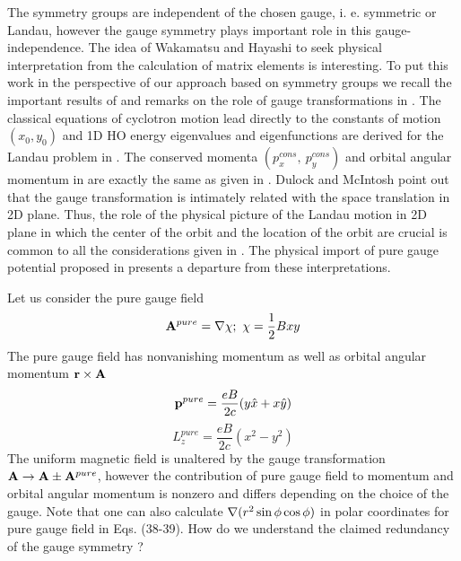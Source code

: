\documentclass[aps, singlecolumn, showpacs]{revtex4-2}
\begin{document}
The symmetry groups are independent of the chosen gauge, i. e. symmetric or Landau, however the gauge symmetry plays important role in this gauge-independence. The idea of Wakamatsu and Hayashi \cite{8} to seek physical interpretation from the calculation of matrix elements is interesting. To put this work in the perspective of our approach based on symmetry groups we recall the important results of \cite{24} and remarks on the role of gauge transformations in \cite{14}. The classical equations of cyclotron motion lead directly to the constants of motion $(x_0, y_0)$  and 1D HO energy eigenvalues and eigenfunctions are derived for the Landau problem in \cite{24}. The conserved momenta $(p_x^{cons},~p_y^{cons})$ and orbital angular momentum in \cite{8} are exactly the same as given in \cite{24}. Dulock and McIntosh \cite{14} point out that the gauge transformation is intimately related with the space translation in 2D plane.  Thus, the role of the physical picture of the Landau motion in 2D plane in which the center of the orbit and the location of the orbit are crucial is common to all the considerations given in \cite{8,14,16,24}. The physical import of pure gauge potential proposed in \cite{25,26} presents a departure from these interpretations.

Let us consider the pure gauge field
\begin{equation}
{\bf A}^{pure} = {\bf \nabla} \chi ;~ \chi = \frac{1}{2} B x y
\end{equation}
The pure gauge field has nonvanishing momentum as well as orbital angular momentum ${\bf r} \times {\bf A}$
\begin{equation}
{\bf p}^{pure} = \frac{e B}{2c} (y \hat{x} +x \hat{y})
\end{equation}
\begin{equation}
L^{pure}_z = \frac{e B}{2 c} (x^2 - y^2)
\end{equation}
The uniform magnetic field is unaltered by the gauge transformation ${\bf A} \rightarrow {\bf A} \pm {\bf A}^{pure}$, however the contribution of pure gauge field to momentum and orbital angular momentum is nonzero and differs depending on the choice of the gauge. Note that one can also calculate  ${\bf \nabla }(r^2 \sin \phi \cos \phi)$ in polar coordinates for pure gauge field in Eqs. (38-39).  How do we understand the claimed redundancy of the gauge symmetry \cite{8}? 
\end{document}
